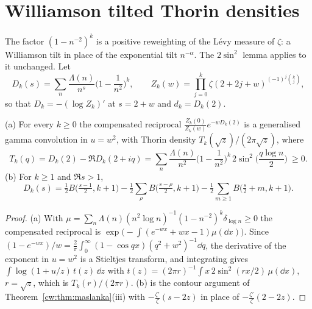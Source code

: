 \section{Williamson tilted Thorin densities}\label{cw:sec:williamson}

The factor $(1-n^{-2})^k$ is a positive reweighting of the L\'evy measure of $\zeta$: a Williamson tilt in place of the exponential tilt $n^{-\alpha}$. The $2\sin^2$ lemma applies to it unchanged. Let
\[
D_k(s)=\sum_n\frac{\Lambda(n)}{n^{s}}\Big(1-\frac1{n^2}\Big)^k,\qquad
Z_k(w)=\prod_{j=0}^k\zeta(2+2j+w)^{(-1)^j\binom kj},
\]
so that $D_k=-(\log Z_k)'$ at $s=2+w$ and $d_k=D_k(2)$.

\begin{proposition}\label{cw:prop:williamson}
(a) For every $k\ge0$ the compensated reciprocal $\frac{Z_k(0)}{Z_k(w)}e^{-wD_k(2)}$ is a generalised gamma convolution in $u=w^2$, with Thorin density $T_k(\sqrt z)/(2\pi\sqrt z)$, where
\[
T_k(q)=D_k(2)-\Re D_k(2+iq)=\sum_n\frac{\Lambda(n)}{n^2}\Big(1-\frac1{n^2}\Big)^k\,2\sin^2\!\Big(\frac{q\log n}{2}\Big)\ \ge0 .
\]
(b) For $k\ge1$ and $\Re s>1$,
\[
D_k(s)=\tfrac12B\big(\tfrac{s-1}{2},k+1\big)-\tfrac12\sum_\rho B\big(\tfrac{s-\rho}{2},k+1\big)-\tfrac12\sum_{m\ge1}B\big(\tfrac s2+m,k+1\big).
\]
\end{proposition}

\begin{proof}
(a) With $\mu=\sum_n\Lambda(n)(n^2\log n)^{-1}(1-n^{-2})^k\delta_{\log n}\ge0$ the compensated reciprocal is $\exp\!\big(-\int(e^{-wx}+wx-1)\mu(\dd x)\big)$. Since $(1-e^{-wx})/w=\frac2\pi\int_0^\infty(1-\cos qx)(q^2+w^2)^{-1}\dd q$, the derivative of the exponent in $u=w^2$ is a Stieltjes transform, and integrating gives $\int\log(1+u/z)\,t(z)\,\dd z$ with $t(z)=(2\pi r)^{-1}\int x\,2\sin^2(rx/2)\,\mu(\dd x)$, $r=\sqrt z$, which is $T_k(r)/(2\pi r)$. (b) is the contour argument of Theorem~\ref{cw:thm:maslanka}(iii) with $-\frac{\zeta'}{\zeta}(s-2z)$ in place of $-\frac{\zeta'}{\zeta}(2-2z)$.
\end{proof}

